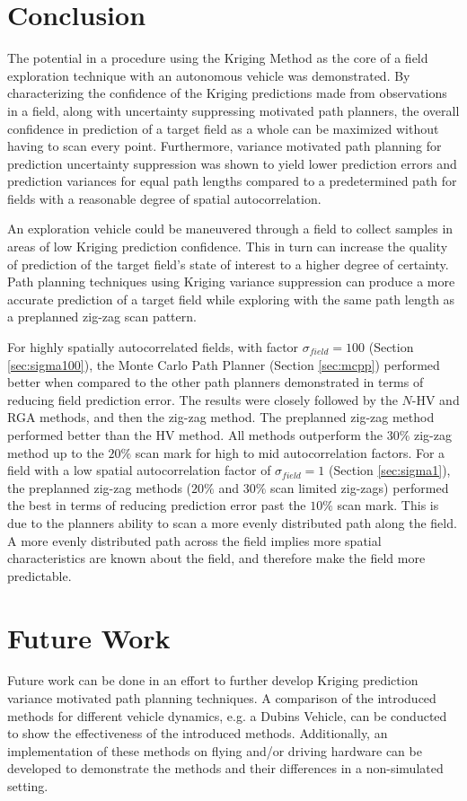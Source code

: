 \chapter{Conclusion}
The potential in a procedure using the Kriging Method as the core of a field exploration technique with an autonomous vehicle was demonstrated. By characterizing the confidence of the Kriging predictions made from observations in a field, along with uncertainty suppressing motivated path planners, the overall confidence in prediction of a target field as a whole can be maximized without having to scan every point. Furthermore, variance motivated path planning for prediction uncertainty suppression was shown to yield lower prediction errors and prediction variances for equal path lengths compared to a predetermined path for fields with a reasonable degree of spatial autocorrelation.

An exploration vehicle could be maneuvered through a field to collect samples in areas of low Kriging prediction confidence. This in turn can increase the quality of prediction of the target field's state of interest to a higher degree of certainty. Path planning techniques using Kriging variance suppression can produce a more accurate prediction of a target field while exploring with the same path length as a preplanned zig-zag scan pattern.

For highly spatially autocorrelated fields, with factor $\sigma_{field} = 100$ (Section \ref{sec:sigma100}), the Monte Carlo Path Planner (Section \ref{sec:mcpp}) performed better when compared to the other path planners demonstrated in terms of reducing field prediction error. The results were closely followed by the $N$-HV and RGA methods, and then the zig-zag method. The preplanned zig-zag method performed better than the HV method. All methods outperform the $30\%$ zig-zag method up to the $20\%$ scan mark for high to mid autocorrelation factors. For a field with a low spatial autocorrelation factor of $\sigma_{field} = 1$ (Section \ref{sec:sigma1}), the preplanned zig-zag methods ($20\%$ and $30\%$ scan limited zig-zags) performed the best in terms of reducing prediction error past the $10\%$ scan mark. This is due to the planners ability to scan a more evenly distributed path along the field. A more evenly distributed path across the field implies more spatial characteristics are known about the field, and therefore make the field more predictable.

\chapter{Future Work}
Future work can be done in an effort to further develop Kriging prediction variance motivated path planning techniques. A comparison of the introduced methods for different vehicle dynamics, e.g. a Dubins Vehicle, can be conducted to show the effectiveness of the introduced methods. Additionally, an implementation of these methods on flying and/or driving hardware can be developed to demonstrate the methods and their differences in a non-simulated setting.

